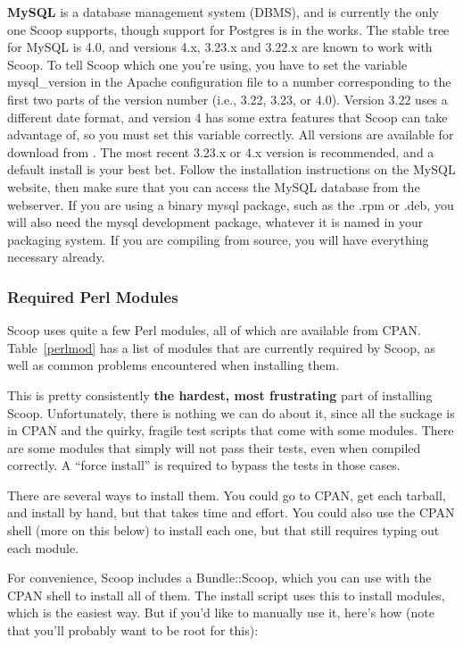 {\bf MySQL} is a database management system (DBMS), and is currently the only one Scoop supports, though support for Postgres is in the works. The stable tree for MySQL is 4.0, and versions 4.x, 3.23.x and 3.22.x are known to work with Scoop.  To tell Scoop which one you're using, you have to set the variable mysql\_version in the Apache configuration file to a number corresponding to the first two parts of the version number (i.e., 3.22, 3.23, or 4.0).  Version 3.22 uses a different date format, and version 4 has some extra features that Scoop can take advantage of, so you must set this variable correctly.  All versions are available for download from .  The most recent 3.23.x or 4.x version is recommended, and a default install is your best bet.  Follow the installation instructions on the MySQL website, then make sure that you can access the MySQL database from the webserver.  If you are using a binary mysql package, such as the .rpm or .deb, you will also need the mysql development package, whatever it is named in your packaging system.  If you are compiling from source, you will have everything necessary already.

\subsubsection{Required Perl Modules}
\label{install-modules}

Scoop uses quite a few Perl modules, all of which are available from CPAN. Table~\ref{perlmod} has a list of modules that are currently required by Scoop, as well as common problems encountered when installing them.

This is pretty consistently {\bf the hardest, most frustrating} part of installing Scoop.  Unfortunately, there is nothing we can do about it, since all the suckage is in CPAN and the quirky, fragile test scripts that come with some modules.  There are some modules that simply will not pass their tests, even when compiled correctly.  A ``force install'' is required to bypass the tests in those cases.

There are several ways to install them. You could go to CPAN, get each tarball, and install by hand, but that takes time and effort. You could also use the CPAN shell (more on this below) to install each one, but that still requires typing out each module.

For convenience, Scoop includes a Bundle::Scoop, which you can use with the CPAN shell to install all of them.  The install script uses this to install modules, which is the easiest way. But if you'd like to manually use it, here's how (note that you'll probably want to be root for this):

